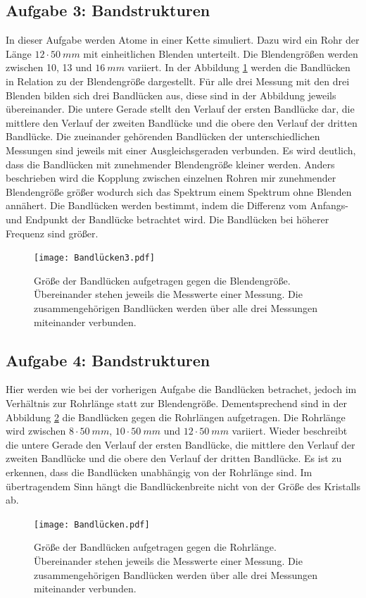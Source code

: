 \subsection{Aufgabe 3: Bandstrukturen}
\FloatBarrier
In dieser Aufgabe werden Atome in einer Kette simuliert.
Dazu wird ein Rohr der Länge $12 \cdot \SI{50}{mm}$ mit einheitlichen Blenden unterteilt.
Die Blendengrößen werden zwischen 10, 13 und $\SI{16}{mm}$ variiert.
In der Abbildung \ref{fig.Aufgabe3} werden die Bandlücken in Relation zu der Blendengröße dargestellt.
Für alle drei Messung mit den drei Blenden bilden sich drei Bandlücken aus, diese sind in der Abbildung jeweils übereinander.
Die untere Gerade stellt den Verlauf der ersten Bandlücke dar, die mittlere den Verlauf der zweiten Bandlücke und die obere den Verlauf der dritten Bandlücke.
Die zueinander gehörenden Bandlücken der unterschiedlichen Messungen sind jeweils mit einer Ausgleichsgeraden verbunden.
Es wird deutlich, dass die Bandlücken mit zunehmender Blendengröße kleiner werden.
Anders beschrieben wird die Kopplung zwischen einzelnen Rohren mir zunehmender Blendengröße größer wodurch sich das Spektrum einem Spektrum ohne Blenden annähert.
Die Bandlücken werden bestimmt, indem die Differenz vom Anfangs- und Endpunkt der Bandlücke betrachtet wird.
Die Bandlücken bei höherer Frequenz sind größer.
\begin{figure}[h!]
  \centering
  \texttt{[image: Bandlücken3.pdf]}
  \caption{Größe der Bandlücken aufgetragen gegen die Blendengröße. Übereinander stehen jeweils die Messwerte einer Messung. Die zusammengehörigen Bandlücken werden über alle drei Messungen miteinander verbunden.}
  \label{fig.Aufgabe3}
\end{figure}
\FloatBarrier

\subsection{Aufgabe 4: Bandstrukturen}
Hier werden wie bei der vorherigen Aufgabe die Bandlücken betrachet, jedoch im Verhältnis zur Rohrlänge statt zur Blendengröße.
Dementsprechend sind in der Abbildung \ref{fig.Aufgabe4} die Bandlücken gegen die Rohrlängen aufgetragen.
Die Rohrlänge wird zwischen $8 \cdot \SI{50}{mm}$, $10 \cdot \SI{50}{mm}$ und $12 \cdot \SI{50}{mm}$ variiert.
Wieder beschreibt die untere Gerade den Verlauf der ersten Bandlücke, die mittlere den Verlauf der zweiten Bandlücke und die obere den Verlauf der dritten Bandlücke.
Es ist zu erkennen, dass die Bandlücken unabhängig von der Rohrlänge sind.
Im übertragendem Sinn hängt die Bandlückenbreite nicht von der Größe des Kristalls ab.
\begin{figure}[h!]
  \centering
  \texttt{[image: Bandlücken.pdf]}
  \caption{Größe der Bandlücken aufgetragen gegen die Rohrlänge. Übereinander stehen jeweils die Messwerte einer Messung. Die zusammengehörigen Bandlücken werden über alle drei Messungen miteinander verbunden.}
  \label{fig.Aufgabe4}
\end{figure}
\FloatBarrier

